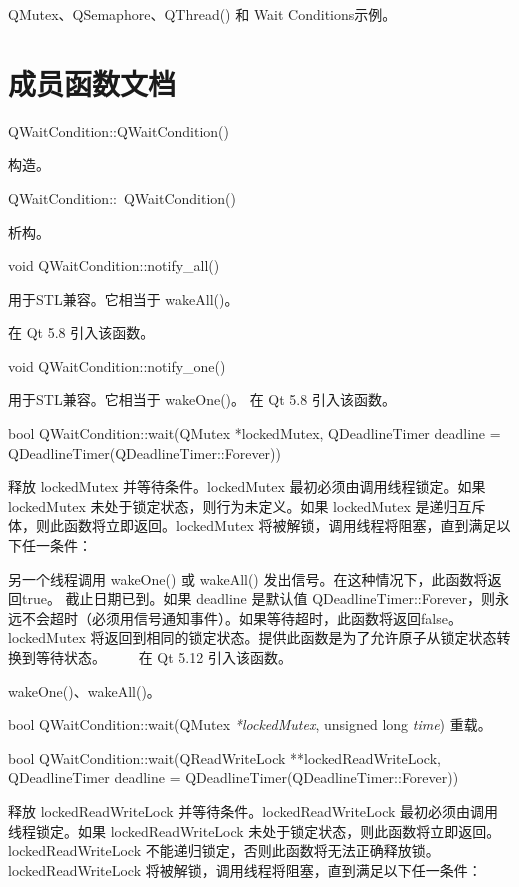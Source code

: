 \begin{seeAlso}
QMutex、QSemaphore、QThread() 和 Wait Conditions示例。
\end{seeAlso}


\section{成员函数文档}

QWaitCondition::QWaitCondition()

构造。

QWaitCondition::~QWaitCondition()

析构。

void QWaitCondition::notify\_all()

用于STL兼容。它相当于 wakeAll()。

在 Qt 5.8 引入该函数。

void QWaitCondition::notify\_one()

用于STL兼容。它相当于 wakeOne()。
在 Qt 5.8 引入该函数。

bool QWaitCondition::wait(QMutex *lockedMutex, QDeadlineTimer deadline = QDeadlineTimer(QDeadlineTimer::Forever))

释放 lockedMutex 并等待条件。lockedMutex 最初必须由调用线程锁定。如果 lockedMutex 未处于锁定状态，则行为未定义。如果 lockedMutex 是递归互斥体，则此函数将立即返回。lockedMutex 将被解锁，调用线程将阻塞，直到满足以下任一条件：

另一个线程调用 wakeOne() 或 wakeAll() 发出信号。在这种情况下，此函数将返回true。
截止日期已到。如果 deadline 是默认值 QDeadlineTimer::Forever，则永远不会超时（必须用信号通知事件）。如果等待超时，此函数将返回false。
lockedMutex 将返回到相同的锁定状态。提供此函数是为了允许原子从锁定状态转换到等待状态。   在 Qt 5.12 引入该函数。

\begin{seeAlso}
 wakeOne()、wakeAll()。
\end{seeAlso}

bool QWaitCondition::wait(QMutex \emph{*lockedMutex}, unsigned long \emph{time})
重载。

bool QWaitCondition::wait(QReadWriteLock **lockedReadWriteLock, QDeadlineTimer deadline = QDeadlineTimer(QDeadlineTimer::Forever))

释放 lockedReadWriteLock 并等待条件。lockedReadWriteLock 最初必须由调用线程锁定。如果 lockedReadWriteLock 未处于锁定状态，则此函数将立即返回。 lockedReadWriteLock 不能递归锁定，否则此函数将无法正确释放锁。lockedReadWriteLock 将被解锁，调用线程将阻塞，直到满足以下任一条件：

